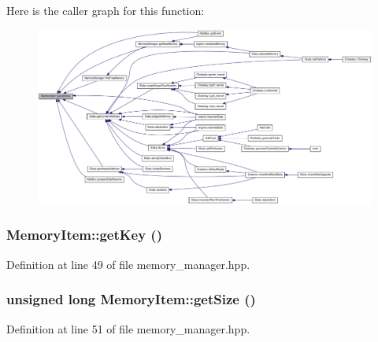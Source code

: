 Here is the caller graph for this function:\nopagebreak
\begin{figure}[H]
\begin{center}
\leavevmode
\includegraphics[width=420pt]{struct_memory_item_a8e5271126c1eb7d5d5b0d611149b67cf_icgraph}
\end{center}
\end{figure}
\hypertarget{struct_memory_item_a21be92140969e7ea8b6859837e9cbab3}{
\subsubsection[{getKey}]{ MemoryItem::getKey ()}}
\label{struct_memory_item_a21be92140969e7ea8b6859837e9cbab3}


Definition at line 49 of file memory\_\-manager.hpp.\hypertarget{struct_memory_item_a1e478ad1487849ca6da2f5c6250a1580}{
\subsubsection[{getSize}]{\setlength{\rightskip}{0pt plus 5cm}unsigned long MemoryItem::getSize ()}}
\label{struct_memory_item_a1e478ad1487849ca6da2f5c6250a1580}


Definition at line 51 of file memory\_\-manager.hpp.

